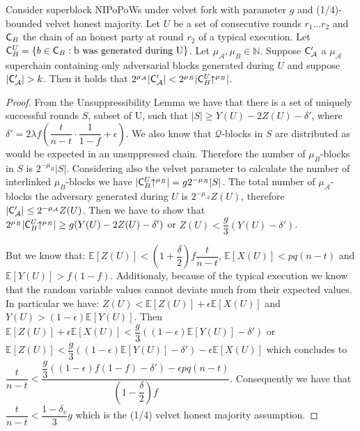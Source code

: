\begin{lemma}
   Consider superblock NIPoPoWs under velvet fork with parameter $g$ and (1/4)-bounded velvet honest majority. Let $U$ be a set of consecutive rounds $r_1 ... r_2$ and $\mathsf{C}_B$ the chain of an honest party at round $r_2$ of a typical execution. Let $\mathsf{C}_B^U = \{b \in \mathsf{C}_B: \text{b was generated during U} \}$. Let $\mu_\mathcal{A}, \mu_B \in \mathbb{N}$. Suppose $\mathsf{C}'_\mathcal{A}$ a $\mu_\mathcal{A}$ superchain containing only adversarial blocks generated during $U$ and suppose $\vert \mathsf{C}'_\mathcal{A} \vert > k$. Then it holds that $ 2^{\mu_\mathcal{A}}\lvert \mathsf{C}'_\mathcal{A} \rvert < 2^{\mu_B}\lvert \mathsf{C}_B^U\negthickspace\uparrow^{\mu_B} \rvert $.
\end{lemma}
\begin{proof} From the Unsuppressibility Lemma we have that there is a set of uniquely successful rounds $S$, subset of U, such that $\lvert S \rvert \geq Y(U) - 2Z(U) - \delta'$, where $\delta' = 2 \lambda f (\dfrac{t}{n-t} \cdot \dfrac{1}{1-f} + \epsilon)$. We also know that $\mathcal{Q}$-blocks in $S$ are distributed as would be expected in an unsuppressed chain. Therefore the number of $\mu_B$-blocks in $S$ is $2^{-\mu_B} \lvert S \rvert$. Considering also the velvet parameter to calculate the number of interlinked $\mu_B$-blocks we have $\lvert \mathsf{C}_B^U\negthickspace\uparrow^{\mu_B} \rvert = g2^{-\mu_B} \lvert S \rvert$.  The total number of $\mu_\mathcal{A}$-blocks the adversary generated during $U$ is $2^{-\mu_\mathcal{A}}Z(U)$, therefore $\lvert \mathsf{C}'_\mathcal{A} \rvert \leq 2^{-\mu_\mathcal{A}}Z(U)$. Then we have to show that $2^{\mu_B}\lvert \mathsf{C}_B^U\negthickspace\uparrow^{\mu_B} \rvert \geq g ( Y(U) - 2Z(U) - \delta' ) $ or $Z(U) < \dfrac{g}{3}(Y(U) - \delta')$.

But we know that\cite{backbone}: $\mathbb{E}[Z(U)] < (1+\dfrac{\delta}{2})f\dfrac{t}{n-t}$, $\mathbb{E}[X(U)] < pq(n-t)$ and $\mathbb{E}[Y(U)] > f(1-f)$. Additionaly, because of the typical execution we know that the random variable values cannot deviate much from their expected values. In particular we have\cite{backbone}: $Z(U) < \mathbb{E}[Z(U)] + \epsilon \mathbb{E}[X(U)]$ and $Y(U) > (1-\epsilon)\mathbb{E}[Y(U)]$. Then $\mathbb{E}[Z(U)] + \epsilon\mathbb{E}[X(U)] < \dfrac{g}{3}( (1-\epsilon)\mathbb{E}[Y(U)] -\delta')$ or $\mathbb{E}[Z(U)]  < \dfrac{g}{3}( (1-\epsilon)\mathbb{E}[Y(U)] -\delta') - \epsilon\mathbb{E}[X(U)]$ which concludes to $\dfrac{t}{n-t} < \dfrac{\dfrac{g}{3}((1-\epsilon)f(1-f)-\delta') - \epsilon pq(n-t)}{(1-\dfrac{\delta}{2})f}$. Consequently we have that $\dfrac{t}{n-t} < \dfrac{1-\delta_v}{3}g$ which is the (1/4) velvet honest majority assumption.
\end{proof}